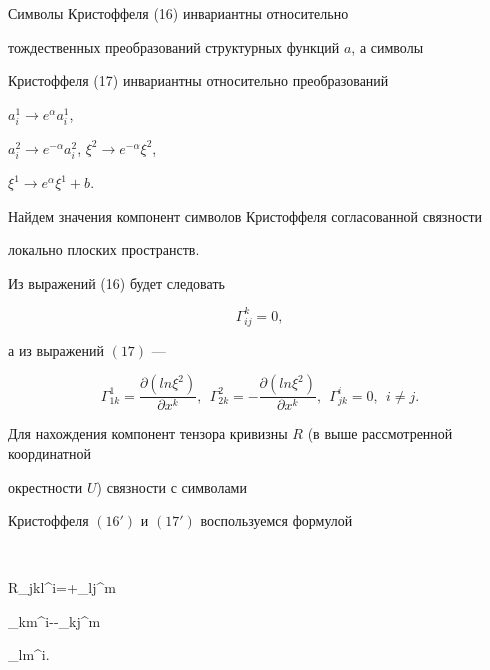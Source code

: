 \begin{cornonum}


Символы Кристоффеля (16) инвариантны относительно


тождественных преобразований структурных функций $a$, а символы


Кристоффеля (17) инвариантны относительно преобразований


$a^1_i\to e^{\alpha}a^1_i$,


$a^2_i\to e^{-\alpha}a^2_i$, $\xi^2\to e^{-\alpha}\xi^2$,


$\xi^1\to e^{\alpha}\xi^1+b$.


\end{cornonum}





Найдем значения компонент символов Кристоффеля согласованной связности


локально плоских пространств.


Из выражений (16) будет следовать


\begin{equation}


\Gamma^k_{ij}=0,\tag{$16'$}


\end{equation}


а из выражений $(17)$ ---


\begin{equation}


\Gamma^1_{1k}=\frac{\partial (ln\xi^2)}{\partial x^k},\ \ 


\Gamma^2_{2k}=-\frac{\partial (ln\xi^2)}{\partial x^k},\ \ 


\Gamma^i_{jk}=0,\ \ i\neq j.\tag{$17'$}


\end{equation}





Для нахождения компонент тензора кривизны $R$ (в выше рассмотренной координатной


окрестности $U$) связности с символами


Кристоффеля $(16')$ и $(17')$ воспользуемся формулой


$$


R_{jkl}^i=+\Gamma _{lj}^m\Gamma


_{km}^i--\Gamma _{kj}^m\Gamma


_{lm}^i.


